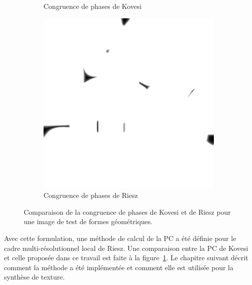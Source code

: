 \begin{figure}
\begin{subfigure}{.3\textwidth}
        \caption{Congruence de phases de Kovesi}
    \end{subfigure}
    \hfill
    \begin{subfigure}{.3\textwidth}
        \centering
        \includegraphics[width=\textwidth]{contenu/resources/images/geometric_shapes_pc_riesz}
        \caption{Congruence de phases de Riesz}
    \end{subfigure}

    \caption{Comparaison de la congruence de phases de Kovesi et de Riesz pour une image de test de formes géométriques.}
    \label{fig:phase-congruency-riesz}
\end{figure}

\bigskip

Avec cette formulation, une méthode de calcul de la PC a été définie pour le cadre multi-résolutionnel local de Riesz. Une comparaison entre la PC de Kovesi et celle proposée dans ce travail est faite à la figure~\ref{fig:phase-congruency-riesz}. Le chapitre suivant décrit comment la méthode a été implémentée et comment elle est utilisée pour la synthèse de texture.